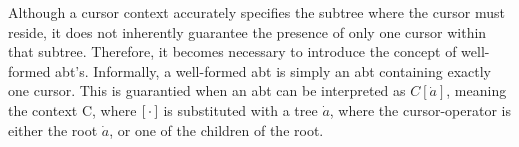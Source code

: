 \documentclass[sigplan,anonymous,review]{acmart}
\begin{document}

Although a cursor context accurately specifies the subtree where the cursor must reside, it does not inherently guarantee the presence of only one cursor within that subtree. Therefore, it becomes necessary to introduce the concept of well-formed abt's. Informally, a well-formed abt is simply an abt containing exactly one cursor. This is guarantied when an abt can be interpreted as $C[\dot{a}]$, meaning the context C, where $[ \, \cdot \, ]$ is substituted with a tree $\dot{a}$, where the cursor-operator is either the root $\dot{a}$, or one of the children of the root.
\end{document}
